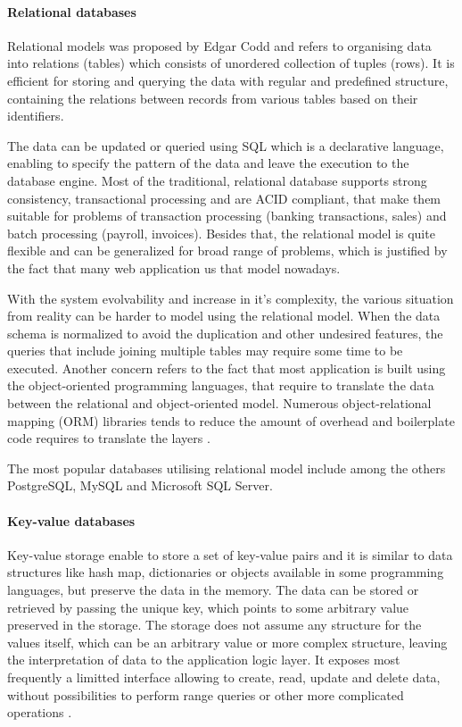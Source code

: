 \paragraph*{Relational databases}

Relational models was proposed by Edgar Codd and refers to organising data into relations (tables) which consists of unordered collection of tuples (rows). It is efficient for storing and querying the data with regular and predefined structure, containing the relations between records from various tables based on their identifiers.

The data can be updated or queried using SQL which is a declarative language, enabling to specify the pattern of the data and leave the execution to the database engine. Most of the traditional, relational database supports strong consistency, transactional processing and are ACID compliant, that make them suitable for problems of transaction processing (banking transactions, sales) and batch processing (payroll, invoices). Besides that, the relational model is quite flexible and can be generalized for broad range of problems, which is justified by the fact that many web application us that model nowadays.

With the system evolvability and increase in it's complexity, the various situation from reality can be harder to model using the relational model. When the data schema is normalized to avoid the duplication and other undesired features, the queries that include joining multiple tables may require some time to be executed. Another concern refers to the fact that most application is built using the object-oriented programming languages, that require to translate the data between the relational and object-oriented model. Numerous object-relational mapping (ORM) libraries tends to reduce the amount of overhead and boilerplate code requires to translate the layers \cite{DesignDataIntensiveApplications}.

The most popular databases utilising relational model include among the others PostgreSQL, MySQL and Microsoft SQL Server.

\paragraph*{Key-value databases}

Key-value storage enable to store a set of key-value pairs and it is similar to data structures like hash map, dictionaries or objects available in some programming languages, but preserve the data in the memory. The data can be stored or retrieved by passing the unique key, which points to some arbitrary value preserved in the storage.
The storage does not assume any structure for the values itself, which can be an arbitrary value or more complex structure, leaving the interpretation of data to the application logic layer.
It exposes most frequently a limitted interface allowing to create, read, update and delete data, without possibilities to perform range queries or other more complicated operations \cite{NoSQLDatabaseSystemsSurveyDecisionGuidance}.


